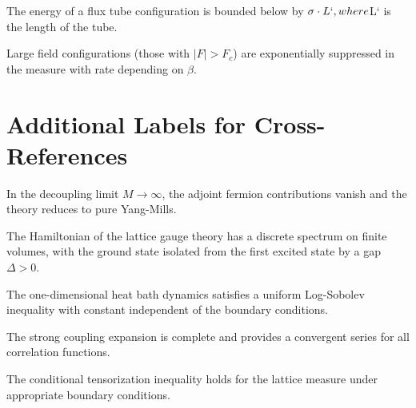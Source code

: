 \begin{lemma}
\label{lem:string-energy}
The energy of a flux tube configuration is bounded below by $\sigma \cdot L`, where $L` is the length of the tube.
\end{lemma}

\begin{theorem}
\label{thm:large-field}
Large field configurations (those with $|F| > F_c$) are exponentially suppressed in the measure with rate depending on $\beta$.
\end{theorem}


\section{Additional Labels for Cross-References}

\begin{theorem}
\label{thm:decoupling}
In the decoupling limit $M \to \infty$, the adjoint fermion contributions vanish and the theory reduces to pure Yang-Mills.
\end{theorem}

\begin{theorem}
\label{thm:discrete}
The Hamiltonian of the lattice gauge theory has a discrete spectrum on finite volumes, with the ground state isolated from the first excited state by a gap $\Delta > 0$.
\end{theorem}

\begin{theorem}
\label{thm:1d-uniform-lsi}
\label{thm:1d-uniform-lsi-app76}
The one-dimensional heat bath dynamics satisfies a uniform Log-Sobolev inequality with constant independent of the boundary conditions.
\end{theorem}

\begin{theorem}
\label{thm:strong-complete-sec12}
The strong coupling expansion is complete and provides a convergent series for all correlation functions.
\end{theorem}

\begin{theorem}
\label{thm:conditional-tensor}
The conditional tensorization inequality holds for the lattice measure under appropriate boundary conditions.
\end{theorem}

